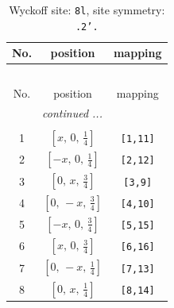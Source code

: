 \documentclass[fleqn,8pt]{jsarticle}
\begin{document}
\begin{longtable}{ccc}
\caption{Wyckoff site: {\tt 8l}, site symmetry: {\tt .2'.}}
 \\
 \hline \hline
No. & position & mapping \\ \hline \endfirsthead

\multicolumn{2}{l}{\tablename\ \thetable{}} \\
 \hline \hline
No. & position & mapping \\ \hline \endhead

 \hline \hline
\multicolumn{2}{r}{\footnotesize\it continued ...} \\ \endfoot

 \hline \hline
\multicolumn{2}{r}{} \\ \endlastfoot

1 & $\left[ x,\, 0,\, \frac{1}{4} \right]$ & {\tt [1,11]} \\ \hline
2 & $\left[ - x,\, 0,\, \frac{1}{4} \right]$ & {\tt [2,12]} \\ \hline
3 & $\left[ 0,\, x,\, \frac{3}{4} \right]$ & {\tt [3,9]} \\ \hline
4 & $\left[ 0,\, - x,\, \frac{3}{4} \right]$ & {\tt [4,10]} \\ \hline
5 & $\left[ - x,\, 0,\, \frac{3}{4} \right]$ & {\tt [5,15]} \\ \hline
6 & $\left[ x,\, 0,\, \frac{3}{4} \right]$ & {\tt [6,16]} \\ \hline
7 & $\left[ 0,\, - x,\, \frac{1}{4} \right]$ & {\tt [7,13]} \\ \hline
8 & $\left[ 0,\, x,\, \frac{1}{4} \right]$ & {\tt [8,14]} \\
\end{longtable}
\renewcommand{\arraystretch}{1.2}
\end{document}
